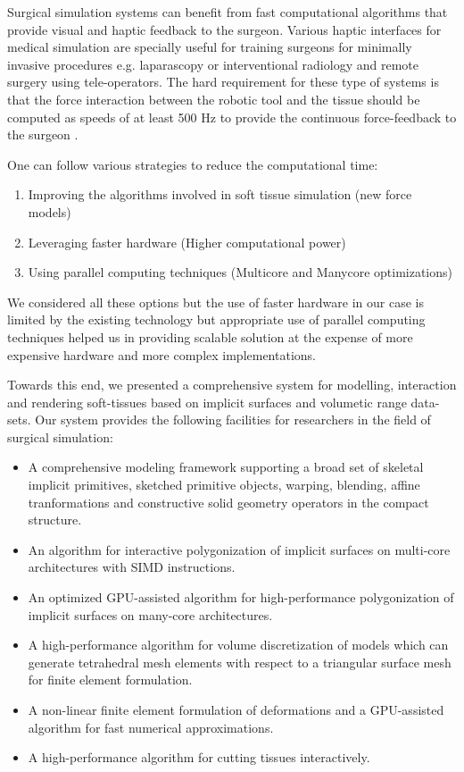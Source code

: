 \label{chapter:conclusion}
Surgical simulation systems can benefit from fast computational algorithms that provide visual and haptic feedback to the surgeon. 
Various haptic interfaces for medical simulation are specially useful for training surgeons for minimally invasive procedures e.g.
laparascopy or interventional radiology and remote surgery using tele-operators. The hard requirement for these type of systems is
that the force interaction between the robotic tool and the tissue should be computed as speeds of at least 500 Hz to provide the 
continuous force-feedback to the surgeon \cite{dimaio2005interactive, Otaduy2005}.

One can follow various strategies to reduce the computational time:

\begin{enumerate}
 \item Improving the algorithms involved in soft tissue simulation (new force models)
 \item Leveraging faster hardware (Higher computational power)
 \item Using parallel computing techniques (Multicore and Manycore optimizations)
\end{enumerate}

We considered all these options but the use of faster hardware in our case is limited by the existing technology but appropriate 
use of parallel computing techniques helped us in providing scalable solution at the expense of more expensive hardware and more 
complex implementations.

Towards this end, we presented a comprehensive system for modelling, interaction and rendering soft-tissues based on implicit surfaces and volumetic range data-sets.
Our system provides the following facilities for researchers in the field of surgical simulation:

\begin{itemize}
 \item A comprehensive modeling framework supporting a broad set of skeletal implicit primitives, sketched primitive objects, warping, blending, 
 affine tranformations and constructive solid geometry operators in the compact \blob structure.
 \item An algorithm for interactive polygonization of implicit surfaces on multi-core architectures with SIMD instructions.
 \item An optimized GPU-assisted algorithm for high-performance polygonization of implicit surfaces on many-core architectures.
 \item A high-performance algorithm for volume discretization of \blob models which can generate tetrahedral mesh elements with respect to a triangular 
 surface mesh for finite element formulation.
 \item A non-linear finite element formulation of deformations and a GPU-assisted algorithm for fast numerical approximations.
 \item A high-performance algorithm for cutting tissues interactively. 
\end{itemize}

